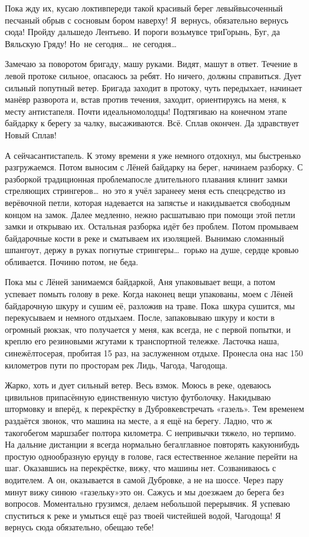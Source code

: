 Пока жду их, кусаю локти\mdash впереди такой красивый берег левый\mdash высоченный песчаный обрыв с сосновым бором наверху! Я~вернусь, обязательно вернусь сюда! Пройду дальше\mdash до Лентьево. И пороги возьму\mdash все три\mdash Горынь, Буг, да Вяльскую Гряду! Но~не сегодня\ldots~не сегодня\ldots 

Замечаю за поворотом бригаду, машу руками. Видят, машут в ответ. Течение в левой протоке сильное, опасаюсь за ребят. Но ничего, должны справиться. Дует сильный попутный ветер. Бригада заходит в протоку, чуть передыхает, начинает манёвр разворота и, встав против течения, заходит, ориентируясь на меня, к месту антистапеля. Почти идеально\mdash  молодцы! Подтягиваю на конечном этапе байдарку к берегу за чалку, высаживаются. Всё. Сплав окончен. Да здравствует Новый Сплав! 

А сейчас\mdash антистапель. К этому времени я уже немного отдохнул, мы быстренько разгружаемся. Потом выносим с Лёней байдарку на берег, начинаем разборку. С разборкой традиционная проблема\mdash после длительного плавания клинит замки стреляющих стрингеров\ldots~но это я учёл заранее\mdash у меня есть спецсредство из верёвочной петли, которая надевается на запястье и накидывается свободным концом на замок. Далее медленно, нежно расшатываю при помощи этой петли замки и открываю их. Остальная разборка идёт без проблем. Потом промываем байдарочные кости в реке и сматываем их изоляцией. Вынимаю сломанный шпангоут, держу в руках погнутые стрингеры\ldots~горько на душе, сердце кровью обливается. Починю потом, не беда. 

Пока мы с Лёней занимаемся байдаркой, Аня упаковывает вещи, а потом успевает помыть голову в реке. Когда наконец вещи упакованы, моем с Лёней байдарочную шкуру и сушим её, разложив на траве. Пока~шкура сушится, мы перекусываем и немного отдыхаем. После, запаковываю шкуру и кости в огромный рюкзак, что получается у меня, как всегда, не с первой попытки, и креплю его резиновыми жгутами к транспортной тележке. Ласточка наша, сине\sdash жёлто\sdash серая, пробитая 15 раз, на заслуженном отдыхе. Пронесла она нас 150 километров пути по просторам рек Лидь, Чагода, Чагодоща. 

Жарко, хоть и дует сильный ветер. Весь взмок. Моюсь в реке, одеваюсь цивильно\mdash в припасённую единственную чистую футболочку. Накидываю штормовку и вперёд, к перекрёстку в Дубровке\mdash встречать «газель». Тем временем раздаётся звонок, что машина на месте, а я ещё на берегу. Ладно, что ж такого\mdash бегом марш\mdash забег полтора километра. С непривычки тяжело, но терпимо. На дальние дистанции я всегда нормально бегал\mdash главное повторять какую\sdash нибудь простую однообразную ерунду в голове, гася естественное желание перейти на шаг. Оказавшись на перекрёстке, вижу, что машины нет. Созваниваюсь с водителем. А он, оказывается в самой Дубровке, а не на шоссе. Через пару минут вижу синюю «газельку»\mdash это он. Сажусь и мы доезжаем до берега без вопросов. Моментально грузимся, делаем небольшой перерывчик. Я успеваю спуститься к реке и умыться ещё раз твоей чистейшей водой, Чагодоща! Я вернусь сюда обязательно, обещаю тебе!

